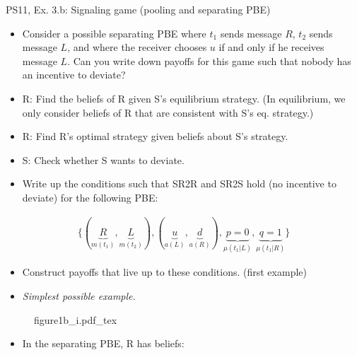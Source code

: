 \begin{frame}{PS11, Ex. 3.b: Signaling game (pooling and separating PBE)}
    \begin{itemize}
        \item[(b)] Consider a possible separating PBE where $t_1$ sends message $R$, $t_2$ sends message $L$, and where the receiver chooses $u$ if and only if he receives message $L$. Can you write down payoffs for this game such that nobody has an incentive to deviate?
    \end{itemize} \vspace{-8pt}
    \begin{multicols}{2}
      \begin{itemize}
        \item[SR3:] R: Find the beliefs of R given S's equilibrium strategy. (In equilibrium, we only consider beliefs of R that are consistent with S's eq. strategy.)
        \item[SR2R:] R: Find R's optimal strategy given beliefs about S's strategy.
        \item[SR2S:] S: Check whether S wants to deviate.
        \item[PBE:]  Write up the conditions such that SR2R and SR2S hold (no incentive to deviate) for the following PBE:
      \end{itemize}\vspace{-14pt}
      \begin{align*}
        \{(\underbrace{R}_{m(t_1)},\underbrace{L}_{m(t_2)}),(\underbrace{u}_{a(L)},\underbrace{d}_{a(R)}),\underbrace{p=0}_{\mu(t_1|L)},\underbrace{q=1}_{\mu(t_1|R)}\}
      \end{align*}\vspace{-12pt}
      \begin{itemize}
        \item[$\rightarrow$] Construct payoffs that live up to these conditions. (first example)
        \item[i:] \textit{Simplest possible example.}
      \end{itemize}
      \vfill\null\columnbreak
      \begin{figure}[!h]
        \center{}
        {figure1b_i.pdf_tex}
      \end{figure} \vspace{-8pt}
      \begin{itemize}
        \item[SR3:] In the separating PBE, R has beliefs:\vspace{-10pt}

\end{itemize}
\end{multicols}
\end{frame}
